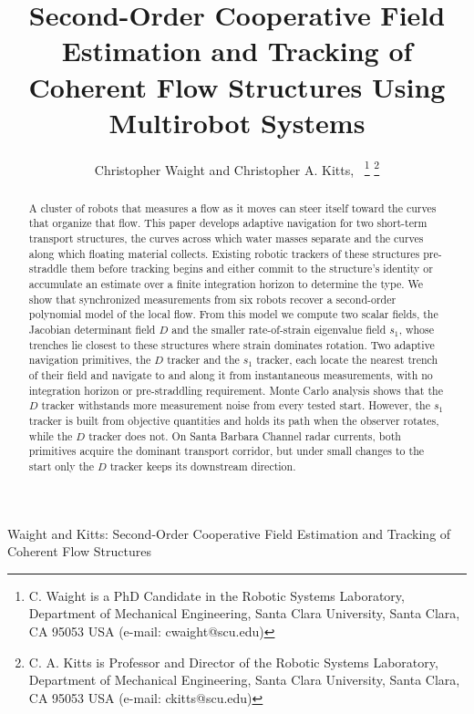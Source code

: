\documentclass[lettersize,journal]{IEEEtran}
\begin{document}
\title{Second-Order Cooperative Field Estimation and Tracking of Coherent Flow Structures Using Multirobot Systems}

\author{Christopher Waight and Christopher A. Kitts,~
\thanks{C. Waight is a PhD Candidate in the Robotic Systems Laboratory, Department of Mechanical Engineering, Santa Clara University, Santa Clara, CA 95053 USA (e-mail: cwaight@scu.edu)}
\thanks{C. A. Kitts is Professor and Director of the Robotic Systems Laboratory, Department of Mechanical Engineering, Santa Clara University, Santa Clara, CA 95053 USA (e-mail: ckitts@scu.edu)}
}
%
{Waight and Kitts: Second-Order Cooperative Field Estimation and Tracking of Coherent Flow Structures}

\maketitle

\begin{abstract}
A cluster of robots that measures a flow as it moves can steer itself
toward the curves that organize that flow. This paper develops adaptive
navigation for two short-term transport structures, the curves across
which water masses separate and the curves along which floating material
collects. Existing robotic trackers of these
structures pre-straddle them before tracking begins and either commit to
the structure's identity or accumulate an estimate over a finite
integration horizon to determine the type. We show that synchronized
measurements from six robots recover a second-order polynomial model of
the local flow. From this model we compute two scalar fields, the Jacobian
determinant field $D$ and the smaller rate-of-strain eigenvalue field
$s_1$, whose trenches lie closest to these structures where strain
dominates rotation. Two adaptive navigation primitives, the $D$ tracker and the
$s_1$ tracker, each locate the nearest trench of their field and navigate
to and along it from instantaneous measurements, with no integration
horizon or pre-straddling requirement. Monte Carlo analysis
shows that the $D$ tracker withstands more measurement noise from every
tested start. However, the $s_1$ tracker is built from objective
quantities and holds its path when the observer rotates, while the $D$
tracker does not. On Santa Barbara Channel radar currents, both primitives
acquire the dominant transport corridor, but under small changes to the
start only the $D$ tracker keeps its downstream direction.

\end{abstract}
\end{document}

